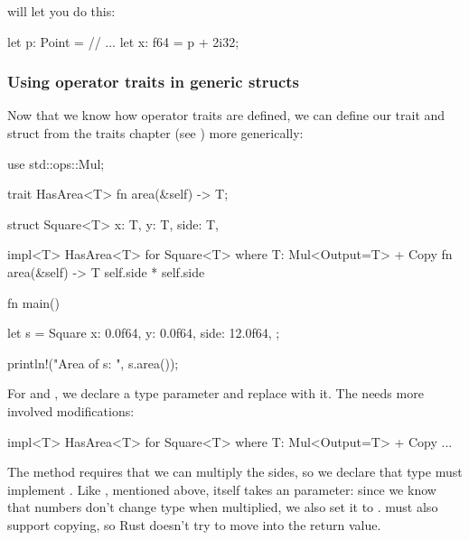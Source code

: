 will let you do this:

\begin{rustc}
let p: Point = // ...
let x: f64 = p + 2i32;
\end{rustc}

\subsubsection*{Using operator traits in generic structs}

Now that we know how operator traits are defined, we can define our  trait and  struct from the 
traits chapter (see ) more generically:

\begin{rustc}
use std::ops::Mul;

trait HasArea<T> {
    fn area(&self) -> T;
}

struct Square<T> {
    x: T,
    y: T,
    side: T,
}

impl<T> HasArea<T> for Square<T>
        where T: Mul<Output=T> + Copy {
    fn area(&self) -> T {
        self.side * self.side
    }
}

fn main() {
    let s = Square {
        x: 0.0f64,
        y: 0.0f64,
        side: 12.0f64,
    };

    println!("Area of s: {}", s.area());
}
\end{rustc}

For  and , we declare a type parameter  and replace  with it. The  needs more 
involved modifications:

\begin{rustc}
impl<T> HasArea<T> for Square<T>
        where T: Mul<Output=T> + Copy { ... }
\end{rustc}

The  method requires that we can multiply the sides, so we declare that type  must implement . 
Like , mentioned above,  itself takes an  parameter: since we know that numbers don't change type when 
multiplied, we also set it to .  must also support copying, so Rust doesn't try to move  into the return value.
